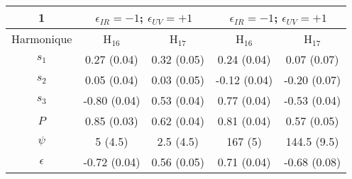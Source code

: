 \begin{tabular}{|c|c|c|c|c|}
\hline
1 & \multicolumn{2}{c|}{$\epsilon_{IR} = -1$; $\epsilon_{UV} = +1$} &  \multicolumn{2}{c|}{$\epsilon_{IR} = -1$; $\epsilon_{UV} = +1$} \\
\hline
Harmonique & H$_{16}$ & H$_{17}$ & H$_{16}$ & H$_{17}$ \\
\hline
$s_1$ & 0.27 (0.04) & 0.32 (0.05) & 0.24 (0.04) & 0.07 (0.07) \\
\hline
$s_2$ & 0.05 (0.04) & 0.03 (0.05) & -0.12 (0.04) & -0.20 (0.07) \\
\hline
$s_3$ & -0.80 (0.04) & 0.53 (0.04) & 0.77 (0.04) & -0.53 (0.04) \\
\hline
$P$ & 0.85 (0.03) & 0.62 (0.04) & 0.81 (0.04) & 0.57 (0.05) \\
\hline
$\psi$ & 5 (4.5) & 2.5 (4.5) & 167 (5) & 144.5 (9.5) \\
\hline
$\epsilon$ & -0.72 (0.04) & 0.56 (0.05) & 0.71 (0.04) & -0.68 (0.08) \\
\hline
\end{tabular}
